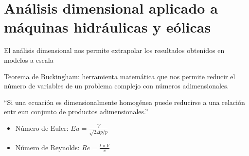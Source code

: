 \chapter{Análisis dimensional aplicado a máquinas hidráulicas y eólicas}

El análisis dimensional nos permite extrapolar los resultados obtenidos en modelos a escala

Teorema de Buckingham: herramienta matemática que nos permite reducir el número de variables de un problema complejo con números adimensionales.

``Si una ecuación es dimensionalmente homogénea puede reducirse a una relación entr eun conjunto de productos adimensionales.''

\begin{itemize}
    \item Número de Euler: $Eu = \frac{V}{\sqrt{2 \Delta p / p}}$
    \item Número de Reynolds: $Re = \frac{l \times V}{v}$

\end{itemize}